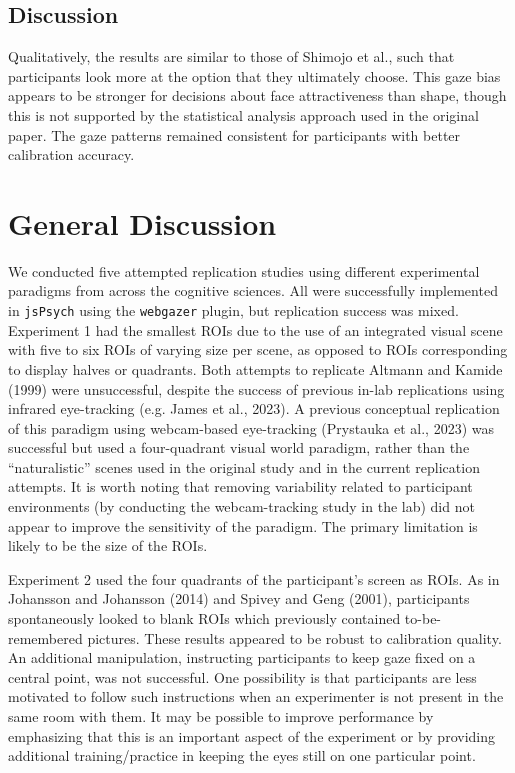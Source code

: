\documentclass[
  man,floatsintext]{apa6}
\begin{document}
\subsection{Discussion}\label{discussion-5}

Qualitatively, the results are similar to those of Shimojo et al., such that participants look more at the option that they ultimately choose. This gaze bias appears to be stronger for decisions about face attractiveness than shape, though this is not supported by the statistical analysis approach used in the original paper. The gaze patterns remained consistent for participants with better calibration accuracy.

\section{General Discussion}\label{general-discussion}

We conducted five attempted replication studies using different experimental paradigms from across the cognitive sciences. All were successfully implemented in \texttt{jsPsych} using the \texttt{webgazer} plugin, but replication success was mixed. Experiment 1 had the smallest ROIs due to the use of an integrated visual scene with five to six ROIs of varying size per scene, as opposed to ROIs corresponding to display halves or quadrants. Both attempts to replicate Altmann and Kamide (1999) were unsuccessful, despite the success of previous in-lab replications using infrared eye-tracking (e.g. James et al., 2023). A previous conceptual replication of this paradigm using webcam-based eye-tracking (Prystauka et al., 2023) was successful but used a four-quadrant visual world paradigm, rather than the ``naturalistic'' scenes used in the original study and in the current replication attempts. It is worth noting that removing variability related to participant environments (by conducting the webcam-tracking study in the lab) did not appear to improve the sensitivity of the paradigm. The primary limitation is likely to be the size of the ROIs.

Experiment 2 used the four quadrants of the participant's screen as ROIs. As in Johansson and Johansson (2014) and Spivey and Geng (2001), participants spontaneously looked to blank ROIs which previously contained to-be-remembered pictures. These results appeared to be robust to calibration quality. An additional manipulation, instructing participants to keep gaze fixed on a central point, was not successful. One possibility is that participants are less motivated to follow such instructions when an experimenter is not present in the same room with them. It may be possible to improve performance by emphasizing that this is an important aspect of the experiment or by providing additional training/practice in keeping the eyes still on one particular point.
\end{document}
